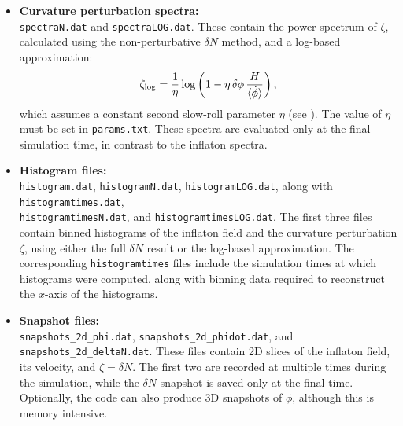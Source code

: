 \documentclass[aps, nofootinbib,superscriptaddress, preprintnumbers, longbibliography]{article}
\begin{document}
\begin{itemize}
    \item \textbf{Curvature perturbation spectra:} \\ \texttt{spectraN.dat} and \texttt{spectraLOG.dat}. These contain the power spectrum of $\zeta$, calculated using the non-perturbative $\delta N$ method, and a log-based approximation:
    \begin{equation}
        \zeta_{\rm log} = \frac{1}{\eta} \log\left(1 - \eta\, \delta\phi\, \frac{H}{\langle \dot\phi \rangle} \right),
    \end{equation}
    which assumes a constant second slow-roll parameter $\eta$ (see \cite{Pi:2022ysn,Caravano:2025diq}). The value of $\eta$ must be set in \texttt{params.txt}. These spectra are evaluated only at the final simulation time, in contrast to the inflaton spectra.

    \item \textbf{Histogram files:} \\ \texttt{histogram.dat}, \texttt{histogramN.dat}, \texttt{histogramLOG.dat}, along with \texttt{histogramtimes.dat},\\\texttt{histogramtimesN.dat}, and \texttt{histogramtimesLOG.dat}. The first three files contain binned histograms of the inflaton field and the curvature perturbation $\zeta$, using either the full $\delta N$ result or the log-based approximation. The corresponding \texttt{histogramtimes} files include the simulation times at which histograms were computed, along with binning data required to reconstruct the $x$-axis of the histograms.

    \item \textbf{Snapshot files:} \\ \texttt{snapshots\_2d\_phi.dat}, \texttt{snapshots\_2d\_phidot.dat}, and \texttt{snapshots\_2d\_deltaN.dat}. These files contain 2D slices of the inflaton field, its velocity, and $\zeta=\delta N$. The first two are recorded at multiple times during the simulation, while the $\delta N$ snapshot is saved only at the final time. Optionally, the code can also produce 3D snapshots of $\phi$, although this is memory intensive.
\end{itemize}
\end{document}

